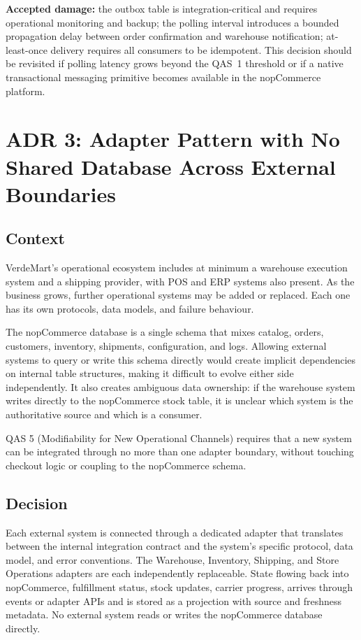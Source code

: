 \textbf{Accepted damage:} the outbox table is integration-critical and requires operational
monitoring and backup; the polling interval introduces a bounded propagation delay between
order confirmation and warehouse notification; at-least-once delivery requires all consumers
to be idempotent. This decision should be revisited if polling latency grows beyond the
QAS~1 threshold or if a native transactional messaging primitive becomes available in
the nopCommerce platform.

\section{ADR 3: Adapter Pattern with No Shared Database Across External Boundaries}

\subsection{Context}

VerdeMart's operational ecosystem includes at minimum a warehouse execution system and a
shipping provider, with POS and ERP systems also present. As the business grows, further
operational systems may be added or replaced. Each one has its own protocols, data models, and
failure behaviour.

The nopCommerce database is a single schema that mixes catalog, orders, customers, inventory,
shipments, configuration, and logs. Allowing external systems to query or write this schema
directly would create implicit dependencies on internal table structures, making it difficult
to evolve either side independently. It also creates ambiguous data ownership: if the warehouse
system writes directly to the nopCommerce stock table, it is unclear which system is the
authoritative source and which is a consumer.

QAS 5 (Modifiability for New Operational Channels) requires that a new system can be
integrated through no more than one adapter boundary, without touching checkout logic or
coupling to the nopCommerce schema.

\subsection{Decision}

Each external system is connected through a dedicated adapter that translates between the
internal integration contract and the system's specific protocol, data model, and error
conventions. The Warehouse, Inventory, Shipping, and Store Operations adapters are each
independently replaceable. State flowing back into nopCommerce, fulfillment status, stock
updates, carrier progress, arrives through events or adapter APIs and is stored as a
projection with source and freshness metadata. No external system reads or writes the
nopCommerce database directly.

